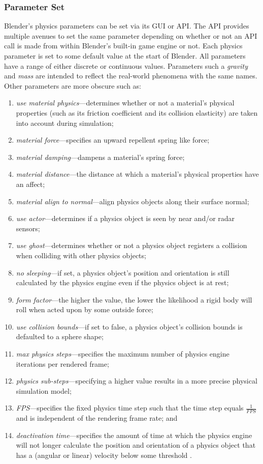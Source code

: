 \subsubsection{Parameter Set}

Blender's physics parameters can be set via its GUI or API. The API provides multiple avenues to set the same parameter depending on whether or not an API call is made from within Blender's built-in game engine or not. Each physics parameter is set to some default value at the start of Blender. All parameters have a range of either discrete or continuous values. Parameters such a \textit{gravity} and \textit{mass} are intended to reflect the real-world phenomena with the same names. Other parameters are more obscure such as:
\begin{enumerate}
 \item \textit{use material physics}---determines whether or not a material's physical properties (such as its friction coefficient and its collision elasticity) are taken into account during simulation;
 \item \textit{material force}---specifies an upward repellent spring like force;
 \item \textit{material damping}---dampens a material's spring force;
 \item \textit{material distance}---the distance at which a material's physical properties have an affect;
 \item \textit{material align to normal}---align physics objects along their surface normal;
 \item \textit{use actor}---determines if a physics object is seen by near and/or radar sensors;
 \item \textit{use ghost}---determines whether or not a physics object registers a collision when colliding with other physics objects;
 \item \textit{no sleeping}---if set, a physics object's position and orientation is still calculated by the physics engine even if the physics object is at rest;
 \item \textit{form factor}---the higher the value, the lower the likelihood a rigid body will roll when acted upon by some outside force;
 \item \textit{use collision bounds}---if set to false, a physics object's collision bounds is defaulted to a sphere shape;
 \item \textit{max physics steps}---specifies the maximum number of physics engine iterations per rendered frame;
 \item \textit{physics sub-steps}---specifying a higher value results in a more precise physical simulation model;
 \item \textit{FPS}---specifies the fixed physics time step such that the time step equals $\frac{1}{FPS}$ and is independent of the rendering frame rate; and
 \item \textit{deactivation time}---specifies the amount of time at which the physics engine will not longer calculate the position and orientation of a physics object that has a (angular or linear) velocity below some threshold \cite{website:blenderapi}.
\end{enumerate}
